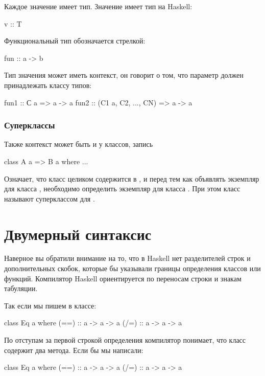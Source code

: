 Каждое значение имеет тип.
Значение  имеет тип  на Haskell: 

\begin{code}
v :: T
\end{code}


Функциональный тип обозначается стрелкой: 

\begin{code}
fun :: a -> b
\end{code}

Тип значения может иметь контекст, он говорит о том, что
параметр должен принадлежать классу типов:

\begin{code}
fun1 :: С a                 => a -> a
fun2 :: (C1 a, C2, ..., CN) => a -> a
\end{code}

\subsubsection{Суперклассы}

Также контекст может быть и у классов, запись

\begin{code}
class A a => B a where
    ...
\end{code}

Означает, что класс  целиком содержится в ,
и перед тем как объявлять экземпляр для класса ,
необходимо определить экземпляр для класса . 
При этом класс  называют суперклассом для .

\section{Двумерный синтаксис}

Наверное вы обратили внимание на то, что в Haskell
нет разделителей строк и дополнительных скобок, которые
бы указывали границы определения классов или функций. 
Компилятор Haskell ориентируется по переносам строки и 
знакам табуляции.

Так если мы пишем в классе:

\begin{code}
class Eq a where
    (==) :: a -> a -> a
    (/=) :: a -> a -> a
\end{code}

По отступам за первой строкой определения компилятор
понимает, что класс содержит два метода. Если бы мы написали:

\begin{code}
class Eq a where
    (==) :: a -> a -> a
(/=) :: a -> a -> a
\end{code}

